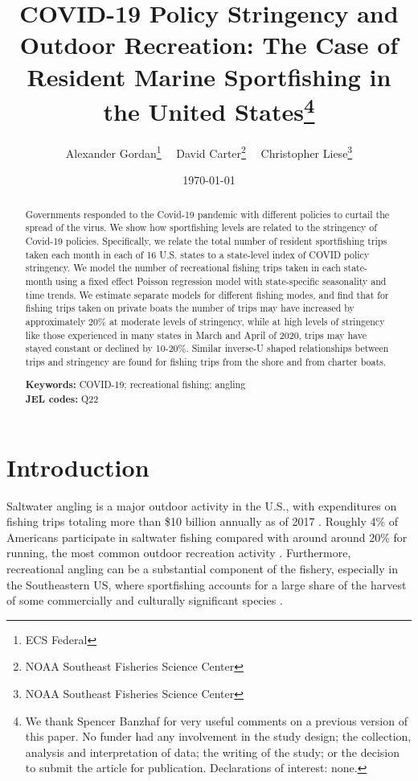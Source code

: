 \documentclass[12pt]{article}
\author{%
Alexander Gordan\thanks{ECS Federal}%
\ \ David Carter\thanks{NOAA Southeast Fisheries Science Center}%
\ \ Christopher Liese\thanks{NOAA Southeast Fisheries Science Center}%

}
\title{\vspace{-2.2cm}\bf{COVID-19 Policy Stringency and Outdoor Recreation: The Case of Resident
Marine Sportfishing in the United States}\footnote{We thank Spencer Banzhaf for very useful comments on a previous version of this paper.  No funder had any involvement in the study design; the collection, analysis and interpretation of data; the writing of the study; or the decision to submit the article for publication. Declarations of interest: none.}}
\begin{document}
\date{\today}
\maketitle
\thispagestyle{empty}

\newpage

\begin{abstract}
\noindent Governments responded to the Covid-19 pandemic with different policies
to curtail the spread of the virus. We show how sportfishing levels are
related to the stringency of Covid-19 policies. Specifically, we relate
the total number of resident sportfishing trips taken each month in each
of 16 U.S. states to a state-level index of COVID policy stringency. We
model the number of recreational fishing trips taken in each state-month
using a fixed effect Poisson regression model with state-specific
seasonality and time trends. We estimate separate models for different
fishing modes, and find that for fishing trips taken on private boats
the number of trips may have increased by approximately 20\% at moderate
levels of stringency, while at high levels of stringency like those
experienced in many states in March and April of 2020, trips may have
stayed constant or declined by 10-20\%. Similar inverse-U shaped
relationships between trips and stringency are found for fishing trips
from the shore and from charter boats.

\vspace{1cm}
\noindent \textbf{Keywords:} COVID-19; recreational fishing; angling \\
\textbf{JEL codes:} Q22

\end{abstract}
\newpage{}

\section{Introduction}

Saltwater angling is a major outdoor activity in the U.S., with expenditures on fishing trips totaling more than \$10 billion annually
as of 2017 \citep{lovell2020economic}. Roughly 4\% of Americans participate in saltwater fishing compared with around around 20\% for running, the most common outdoor recreation activity \citep{2019OutdoorReport}.  Furthermore, recreational angling can be a substantial component of the fishery, especially in the Southeastern US, where sportfishing accounts for a large share of the harvest of some commercially and culturally significant species \citep{lewin2019potential}. 
\end{document}
